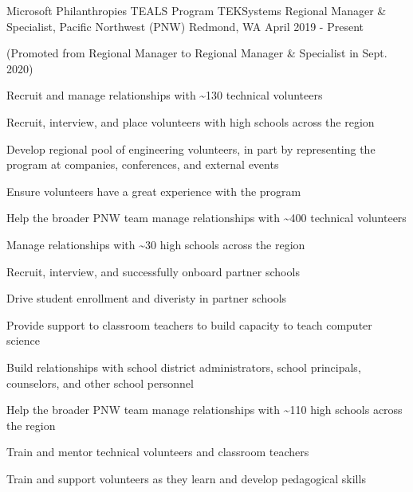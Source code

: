 \begin{cventries}

  \cventry
{Microsoft Philanthropies TEALS Program \newline TEKSystems}
    {Regional Manager \& Specialist, Pacific Northwest (PNW)}
    {Redmond, WA}
    {April 2019 - Present}
    {(Promoted from Regional Manager to Regional Manager \& Specialist in Sept. 2020)\vspace{4mm}
      \begin{cvitems}
	\item Recruit and manage relationships with \~{}130 technical volunteers\\
	\begin{cvitems}
		\item Recruit, interview, and place volunteers with high schools across the region
		\item Develop regional pool of engineering volunteers, in part by representing the program at companies, conferences, and external events
		\item Ensure volunteers have a great experience with the program
		\item Help the broader PNW team manage relationships with \~{}400 technical volunteers
	\end{cvitems}
	\vspace{2mm}
	\item Manage relationships with \~{}30 high schools across the region\\
		\begin{cvitems}
		\item Recruit, interview, and successfully onboard partner schools
		\item Drive student enrollment and diveristy in partner schools
		\item Provide support to classroom teachers to build capacity to teach computer science
		\item Build relationships with school district administrators, school principals, counselors, and other school personnel
		\item Help the broader PNW team manage relationships with \~{}110 high schools across the region
	\end{cvitems}
	\vspace{2mm}
	\item Train and mentor technical volunteers and classroom teachers\\
		\begin{cvitems}
		\item Train and support volunteers as they learn and develop pedagogical skills

\end{cvitems}
\end{cvitems}}
\end{cventries}
